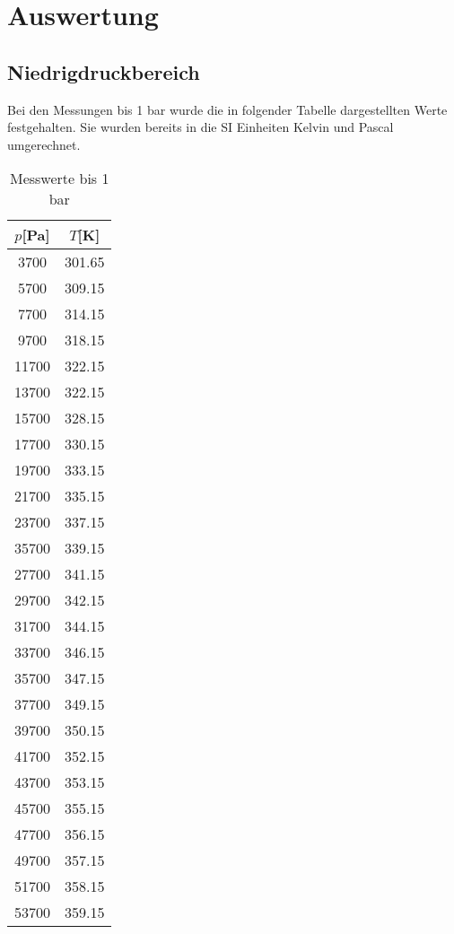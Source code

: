 \section{Auswertung}
\label{sec:Auswertung}
\subsection{Niedrigdruckbereich}

  Bei den Messungen bis 1 bar wurde die in folgender Tabelle dargestellten Werte festgehalten. Sie
  wurden bereits in die SI Einheiten Kelvin und Pascal umgerechnet.
  \begin{table}[H]
    \centering
   \caption{Messwerte bis 1 bar}
   \label{tab:data}
   \begin{tabular}{c c}
   \toprule
    $p$[Pa] & $T$[K] \\
    \midrule
      3700 &   301.65 \\  
      5700 &   309.15 \\  
      7700 &   314.15 \\  
      9700 &   318.15 \\ 
      11700 &   322.15 \\ 
      13700 &   322.15 \\ 
      15700 &   328.15 \\ 
      17700 &   330.15 \\ 
      19700 &   333.15 \\ 
      21700 &   335.15 \\ 
      23700 &   337.15 \\ 
      35700 &   339.15 \\ 
      27700 &   341.15 \\ 
      29700 &   342.15 \\ 
      31700 &   344.15 \\ 
      33700 &   346.15 \\ 
      35700 &   347.15 \\ 
      37700 &   349.15 \\
      39700 &   350.15 \\ 
      41700 &   352.15 \\ 
      43700 &   353.15 \\ 
      45700 &   355.15 \\ 
      47700 &   356.15 \\ 
      49700 &   357.15 \\ 
      51700 &   358.15 \\ 
      53700 &   359.15 \\ 

\end{tabular}
\end{table}
